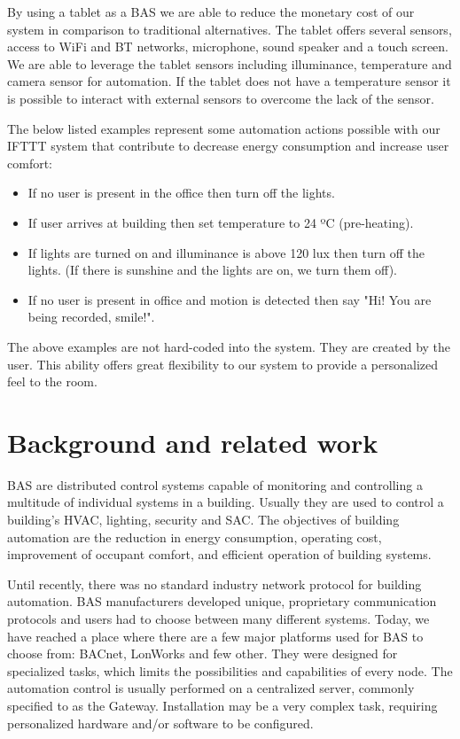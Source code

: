 \documentclass[conference]{IEEEtran}
\begin{document}
By using a tablet as a \ac{BAS} we are able to reduce the monetary cost of our system in comparison to traditional alternatives. The tablet offers several sensors, access to \ac{WiFi} and \ac{BT} networks, microphone, sound speaker and a touch screen. We are able to leverage the tablet sensors including illuminance, temperature and camera sensor for automation. If the tablet does not have a temperature sensor it is possible to interact with external sensors to overcome the lack of the sensor.

The below listed examples represent some automation actions possible with our \ac{IFTTT} system that contribute to decrease energy consumption and increase user comfort:

\begin{itemize}
\item If no user is present in the office then turn off the lights.
\item If user arrives at building then set temperature to 24 ºC (pre-heating). 
\item If lights are turned on and illuminance is above 120 lux then turn off the lights. (If there is  sunshine and the lights are on, we turn them off).
\item If no user is present in office and motion is detected then say "Hi! You are being recorded, smile!".
\end{itemize}

The above examples are not hard-coded into the system. They are created by the user. This ability offers great flexibility to our system to provide a personalized feel to the room.




\section{Background and related work}
\label{rel}

\ac{BAS} are distributed control systems capable of monitoring and controlling a multitude of individual systems in a building. Usually they are used to control a building's \ac{HVAC}, lighting, security and \ac{SAC}.
The objectives of building automation are the reduction in energy consumption, operating cost, improvement of occupant comfort, and efficient operation of building systems.



Until recently, there was no standard industry network protocol for building automation. \ac{BAS} manufacturers developed unique, proprietary communication protocols and users had to choose between many different systems. Today, we have reached a place where there are a few major platforms used for \ac{BAS} to choose from: BACnet\cite{livro_automation,bacnet:artigo1,bacnet:bib,livro_automation2}, LonWorks\cite{livro_automation2,livro_automation} and few other. 
They were designed for specialized tasks, which limits the possibilities and capabilities of every node. The automation control is usually performed on a
centralized server, commonly specified to as the Gateway. Installation may be a very complex task, requiring personalized hardware and/or software to be configured.
\end{document}
